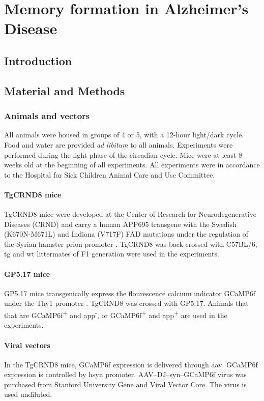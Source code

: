 \chapter{Memory formation in Alzheimer's Disease}
\section{Introduction}

\section{Material and Methods}

\subsection{Animals and vectors}
All animals were housed in groups of 4 or 5, with a 12-hour light/dark cycle. Food and water are provided \textit{ad libitum} to all animals. Experiments were performed during the light phase of the circadian cycle. Mice were at least 8 weeks old at the beginning of all experiments. All experiments were in accordance to the Hospital for Sick Children Animal Care and Use Committee.

\subsubsection{TgCRND8 mice}
TgCRND8 mice were developed at the Center of Research for Neurodegenerative Diseases (CRND) and carry a human APP695 transgene with the Swedish (K670N-M671L) and Indiana (V717F) FAD mutations under the regulation of the Syrian hamster prion promoter \citep{chishti01}. TgCRND8 was back-crossed with C57BL/6, \gls{tg} and \gls{wt} littermates of F1 generation were used in the experiments.


\subsubsection{GP5.17 mice}
GP5.17 mice transgenically express the flourescence calcium indicator GCaMP6f under the Thy1 promoter \citep{dana14}. TgCRND8 was crossed with GP5.17. Animals that that are GCaMP6f\textsuperscript{+} and \gls{app}\textsuperscript{-}, or GCaMP6f\textsuperscript{+} and \gls{app}\textsuperscript{+} are used in the experiments. 

\subsubsection{Viral vectors}
In the TgCRND8 mice, GCaMP6f expression is delivered through \gls{aav}. GCaMP6f expression is controlled by \gls{hsyn} promoter. AAV--DJ--syn--GCaMP6f virus was purchased from Stanford University Gene and Viral Vector Core. The virus is used undiluted. 

